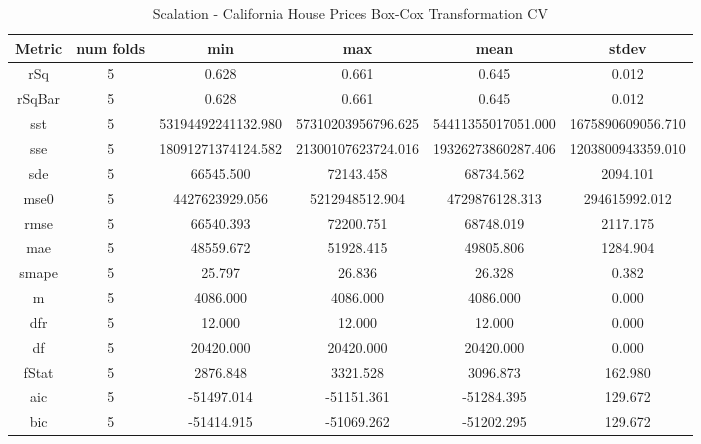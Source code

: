 \documentclass{article}
\begin{document}
\begin{table}[H]
\centering
\caption{Scalation - California House Prices Box-Cox Transformation CV}
\label{tab:Scalation - House Prices Box-Cox Transformation CV}
\begin{tabular}{|c|c|c|c|c|c|}\hline
Metric & num folds & min & max & mean & stdev \\ \hline \hline
rSq & 5 & 0.628 & 0.661 & 0.645 & 0.012 \\ \hline
rSqBar & 5 & 0.628 & 0.661 & 0.645 & 0.012 \\ \hline
sst & 5 & 53194492241132.980 & 57310203956796.625 & 54411355017051.000 & 1675890609056.710 \\ \hline
sse & 5 & 18091271374124.582 & 21300107623724.016 & 19326273860287.406 & 1203800943359.010 \\ \hline
sde & 5 & 66545.500 & 72143.458 & 68734.562 & 2094.101 \\ \hline
mse0 & 5 & 4427623929.056 & 5212948512.904 & 4729876128.313 & 294615992.012 \\ \hline
rmse & 5 & 66540.393 & 72200.751 & 68748.019 & 2117.175 \\ \hline
mae & 5 & 48559.672 & 51928.415 & 49805.806 & 1284.904 \\ \hline
smape & 5 & 25.797 & 26.836 & 26.328 & 0.382 \\ \hline
m & 5 & 4086.000 & 4086.000 & 4086.000 & 0.000 \\ \hline
dfr & 5 & 12.000 & 12.000 & 12.000 & 0.000 \\ \hline
df & 5 & 20420.000 & 20420.000 & 20420.000 & 0.000 \\ \hline
fStat & 5 & 2876.848 & 3321.528 & 3096.873 & 162.980 \\ \hline
aic & 5 & -51497.014 & -51151.361 & -51284.395 & 129.672 \\ \hline
bic & 5 & -51414.915 & -51069.262 & -51202.295 & 129.672 \\ \hline
\end{tabular}
\end{table}
\end{document}
